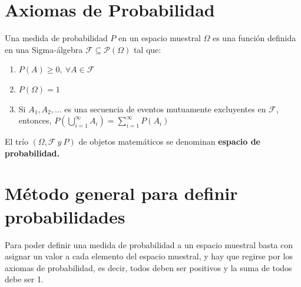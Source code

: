 \documentclass[
  letterpaper,
  DIV=11,
  numbers=noendperiod]{scrreprt}
\providecommand{\tightlist}{%
  \setlength{\itemsep}{0pt}\setlength{\parskip}{0pt}}
\begin{document}
\section{Axiomas de Probabilidad}\label{axiomas-de-probabilidad}

\begin{tcolorbox}[enhanced jigsaw, arc=.35mm, bottomrule=.15mm, bottomtitle=1mm, breakable, colback=white, colbacktitle=quarto-callout-warning-color!10!white, colframe=quarto-callout-warning-color-frame, coltitle=black, left=2mm, leftrule=.75mm, opacityback=0, opacitybacktitle=0.6, rightrule=.15mm, title={Definición}, titlerule=0mm, toprule=.15mm, toptitle=1mm]

Una medida de probabilidad \(P\) en un espacio muestral \(\Omega\) es
una función definida en una Sigma-álgebra
\(\mathcal{F} \subseteq \mathcal{P(\Omega)}\) tal que:

\begin{enumerate}
\def\labelenumi{\arabic{enumi}.}
\tightlist
\item
  \(P(A) \ge 0, \ \forall A \in \mathcal{F}\)
\item
  \(P(\Omega) = 1\)
\item
  Si \(A_1, A_2,\ldots\) es una secuencia de eventos mutuamente
  excluyentes en \(\mathcal{F}\), entonces,
  \(P(\bigcup_{i = 1}^{\infty}A_i)=\sum_{i=1}^{\infty}P(A_i)\)
\end{enumerate}

El trío \(( \Omega, \mathcal{F} \ y \ P)\) de objetos matemáticos se
denominan \textbf{espacio de probabilidad.}

\end{tcolorbox}

\section{Método general para definir
probabilidades}\label{muxe9todo-general-para-definir-probabilidades}

Para poder definir una medida de probabilidad a un espacio muestral
basta con asignar un valor a cada elemento del espacio muestral, y hay
que regirse por los axiomas de probabilidad, es decir, todos deben ser
positivos y la suma de todos debe ser 1.
\end{document}
